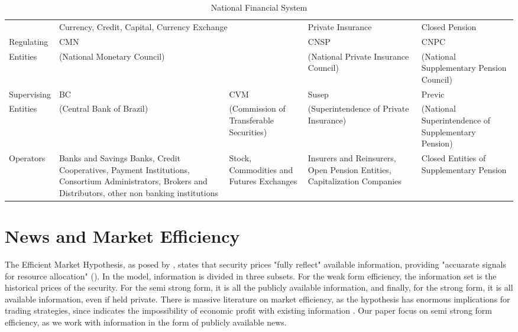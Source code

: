 \documentclass[a4paper]{article}
\begin{document}
\begin{table}[H]
\caption{National Financial System}
\label{tab:sistemanacional}
\centering
\begin{tabular}{lp{2.3cm}|p{2.3cm}|p{2.3cm}|p{2.3cm}}
 & \multicolumn{2}{p{4.6cm}||}{Currency, Credit, Capital, Currency Exchange} & \multicolumn{1}{l||}{Private Insurance} & \multicolumn{1}{l}{Closed Pension} \\ \cline{2-5} 
\multicolumn{1}{l|}{Regulating} & \multicolumn{2}{l||}{CMN} & \multicolumn{1}{p{2.3cm}||}{CNSP} & \multicolumn{1}{p{2.3cm}|}{CNPC} \\
\multicolumn{1}{l|}{Entities} & \multicolumn{2}{l||}{(National Monetary Council)} & \multicolumn{1}{p{2.75cm}||}{(National Private Insurance Council)} & \multicolumn{1}{p{2.3cm}|}{(National Supplementary Pension Council)} \\ \hline
\multicolumn{1}{l|}{Supervising} & \multicolumn{1}{p{2.3cm}||}{BC} & \multicolumn{1}{p{2.3cm}||}{CVM} & \multicolumn{1}{p{2.3cm}||}{Susep} & \multicolumn{1}{p{2.3cm}|}{Previc} \\
\multicolumn{1}{l|}{Entities} & \multicolumn{1}{p{2.3cm}||}{(Central Bank of Brazil)} & \multicolumn{1}{p{2.3cm}||}{(Commission of Transferable Securities)} & \multicolumn{1}{p{2.75cm}||}{(Superintendence of Private Insurance)} & \multicolumn{1}{p{2.3cm}|}{(National Superintendence of Supplementary Pension)} \\ \hline
\multicolumn{1}{l|}{Operators} & \multicolumn{1}{p{2.3cm}||}{Banks and Savings Banks,  Credit Cooperatives, Payment Institutions, Consortium Administrators, Brokers and Distributors, other non banking institutions} & \multicolumn{1}{p{2.3cm}||}{Stock, Commodities and Futures Exchanges} & \multicolumn{1}{p{2.75cm}||}{Insurers and Reinsurers, Open Pension Entities, Capitalization Companies} & \multicolumn{1}{p{2.3cm}|}{Closed Entities of Supplementary Pension} \\ \cline{2-5} 
\end{tabular}
\end{table}

\section{News and Market Efficiency}


The Efficient Market Hypothesis, as posed by \citet{fama1970}, states that security prices "fully reflect" available information, providing "accuarate signals for resource allocation" (\citet{fama1970}). In the model, information is divided in three subsets. For the weak form efficiency, the information set is the historical prices of the security. For the semi strong form, it is all the publicly available information, and finally, for the strong form, it is all available information, even if held private. There is massive literature on market efficiency, as the hypothesis has enormous implications for trading strategies, since indicates the impossibility of economic profit with existing information \citet{kamal2014}. Our paper focus on semi strong form efficiency, as we work with information in the form of publicly available news.
\end{document}
